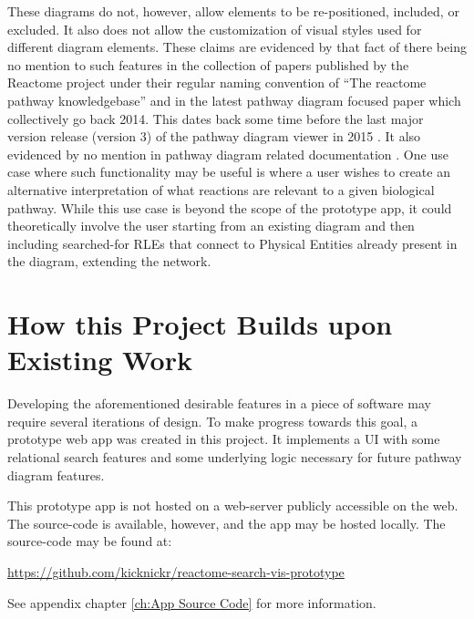 \documentclass[12pt]{report}
\begin{document}
These diagrams do not, however, allow elements to be re-positioned, included, or excluded. It also does not allow the customization of visual styles used for different diagram elements. These claims are evidenced by that fact of there being no mention to such features in the collection of papers published by the Reactome project under their regular naming convention of ``The reactome pathway knowledgebase'' \cite{CroftDavid2014TRpk, FabregatA.2016Trpk, FabregatAntonio2018TRPK, JassalB.2020Trpk} and in the latest pathway diagram focused paper \cite{FabregatAntonio2018Rdvd} which collectively go back 2014. This dates back some time before the last major version release (version 3) of the pathway diagram viewer in 2015 \cite{FabregatA.2016Trpk}. It also evidenced by no mention in pathway diagram related documentation \cite{ThePathwayBrowserGeneralDescription, PathwayDiagramsSpecifications}. One use case where such functionality may be useful is where a user wishes to create an alternative interpretation of what reactions are relevant to a given biological pathway. While this use case is beyond the scope of the prototype app, it could theoretically involve the user starting from an existing diagram and then including searched-for RLEs that connect to Physical Entities already present in the diagram, extending the network.

\section{How this Project Builds upon Existing Work}
Developing the aforementioned desirable features in a piece of software may require several iterations of design. To make progress towards this goal, a prototype web app was created in this project. It implements a UI with some relational search features and some underlying logic necessary for future pathway diagram features.

This prototype app is not hosted on a web-server publicly accessible on the web. The source-code is available, however, and the app may be hosted locally. The source-code may be found at:

\noindent\url{https://github.com/kicknickr/reactome-search-vis-prototype}

See appendix chapter \ref{ch:App Source Code} for more information.
\end{document}
